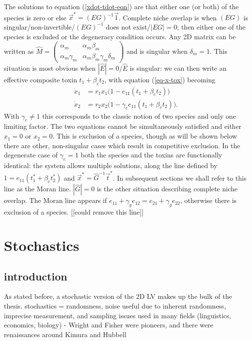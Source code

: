 \documentclass[a4paper,11pt]{article}
\numberwithin{equation}{section} %
\begin{document}
The solutions to equation (\ref{xdot-tdot-eqn}) are that either one (or both) of the species is zero or else $\vec{x}^* = (E G)^{-1}\vec{1}$. 
Complete niche overlap is when $(E G)$ is singular/non-invertible/$(E G)^{-1}$ does not exist/$|E G|=0$; then either one of the species is excluded or the degeneracy condition occurs. 
Any 2D matrix can be written as $\hat{M}=\begin{pmatrix}
\alpha_m   & \alpha_m\beta_m \\
\alpha_m\gamma_m & \alpha_m\beta_m\gamma_m\delta_m
\end{pmatrix}$ and is singular when $\delta_m=1$. 
This situation is most obvious when $|\hat{E}|=0$/$\hat{E}$ is singular: we can then write an effective composite toxin $t_1 + \beta_e t_2$, with equation (\ref{eq-x-tox}) becoming
\begin{align*}
\dot{x}_1 &= r_1 x_1\big(1 -          e_{11}\left( t_1 + \beta_e t_2 \right) \big) \\
\dot{x}_2 &= r_2 x_2\big(1 - \gamma_e e_{11}\left( t_1 + \beta_e t_2 \right) \big).
\end{align*}
With $\gamma_e\neq 1$ this corresponds to the classic notion of two species and only one limiting factor. The two equations cannot be simultaneously satisfied and either $x_1=0$ or $x_2=0$. This is exclusion of a species, though as will be shown below there are other, non-singular cases which result in competitive exclusion. 
In the degenerate case of $\gamma_e=1$ both the species and the toxins are functionally identical: the system allows multiple solutions, along the line defined by $1=e_{11}\left( t_1^* + \beta_e t_2^* \right)$ and $\vec{x}^*=\hat{G}^{-1}\vec{t}^*$. 
In subsequent sections we shall refer to this line as the Moran line. 
$|\hat{G}|=0$ is the other situation describing complete niche overlap. The Moran line appears if $e_{11}+\gamma_ge_{12}=e_{21}+\gamma_ge_{22}$, otherwise there is exclusion of a species. [[could remove this line]]








\section{Stochastics}
\subsection{introduction}
As stated before, a stochastic version of the 2D LV makes up the bulk of the thesis. 
stochastics = randomness, noise
useful due to inherent randomness, imprecise measurement, and sampling issues
used in many fields (linguistics, economics, biology) - Wright and Fisher were pioneers, and there were renaissances around Kimura and Hubbell
\end{document}
